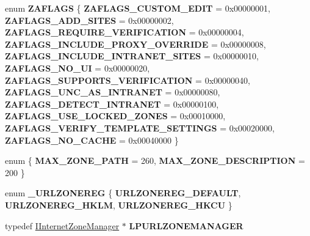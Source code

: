 \begin{DoxyCompactItemize}
enum {\bfseries Z\+A\+F\+L\+A\+GS} \{ \newline
{\bfseries Z\+A\+F\+L\+A\+G\+S\+\_\+\+C\+U\+S\+T\+O\+M\+\_\+\+E\+D\+IT} = 0x00000001, 
{\bfseries Z\+A\+F\+L\+A\+G\+S\+\_\+\+A\+D\+D\+\_\+\+S\+I\+T\+ES} = 0x00000002, 
{\bfseries Z\+A\+F\+L\+A\+G\+S\+\_\+\+R\+E\+Q\+U\+I\+R\+E\+\_\+\+V\+E\+R\+I\+F\+I\+C\+A\+T\+I\+ON} = 0x00000004, 
{\bfseries Z\+A\+F\+L\+A\+G\+S\+\_\+\+I\+N\+C\+L\+U\+D\+E\+\_\+\+P\+R\+O\+X\+Y\+\_\+\+O\+V\+E\+R\+R\+I\+DE} = 0x00000008, 
\newline
{\bfseries Z\+A\+F\+L\+A\+G\+S\+\_\+\+I\+N\+C\+L\+U\+D\+E\+\_\+\+I\+N\+T\+R\+A\+N\+E\+T\+\_\+\+S\+I\+T\+ES} = 0x00000010, 
{\bfseries Z\+A\+F\+L\+A\+G\+S\+\_\+\+N\+O\+\_\+\+UI} = 0x00000020, 
{\bfseries Z\+A\+F\+L\+A\+G\+S\+\_\+\+S\+U\+P\+P\+O\+R\+T\+S\+\_\+\+V\+E\+R\+I\+F\+I\+C\+A\+T\+I\+ON} = 0x00000040, 
{\bfseries Z\+A\+F\+L\+A\+G\+S\+\_\+\+U\+N\+C\+\_\+\+A\+S\+\_\+\+I\+N\+T\+R\+A\+N\+ET} = 0x00000080, 
\newline
{\bfseries Z\+A\+F\+L\+A\+G\+S\+\_\+\+D\+E\+T\+E\+C\+T\+\_\+\+I\+N\+T\+R\+A\+N\+ET} = 0x00000100, 
{\bfseries Z\+A\+F\+L\+A\+G\+S\+\_\+\+U\+S\+E\+\_\+\+L\+O\+C\+K\+E\+D\+\_\+\+Z\+O\+N\+ES} = 0x00010000, 
{\bfseries Z\+A\+F\+L\+A\+G\+S\+\_\+\+V\+E\+R\+I\+F\+Y\+\_\+\+T\+E\+M\+P\+L\+A\+T\+E\+\_\+\+S\+E\+T\+T\+I\+N\+GS} = 0x00020000, 
{\bfseries Z\+A\+F\+L\+A\+G\+S\+\_\+\+N\+O\+\_\+\+C\+A\+C\+HE} = 0x00040000
 \}
\item 
\mbox{\label{interface_i_internet_zone_manager_afebaa6012ca6e09c96630a4e4b1234d0}} 
enum \{ {\bfseries M\+A\+X\+\_\+\+Z\+O\+N\+E\+\_\+\+P\+A\+TH} = 260, 
{\bfseries M\+A\+X\+\_\+\+Z\+O\+N\+E\+\_\+\+D\+E\+S\+C\+R\+I\+P\+T\+I\+ON} = 200
 \}
\item 
\mbox{\label{interface_i_internet_zone_manager_abea6d9e487039d145153d75d36479a5f}} 
enum {\bfseries \+\_\+\+U\+R\+L\+Z\+O\+N\+E\+R\+EG} \{ {\bfseries U\+R\+L\+Z\+O\+N\+E\+R\+E\+G\+\_\+\+D\+E\+F\+A\+U\+LT}, 
{\bfseries U\+R\+L\+Z\+O\+N\+E\+R\+E\+G\+\_\+\+H\+K\+LM}, 
{\bfseries U\+R\+L\+Z\+O\+N\+E\+R\+E\+G\+\_\+\+H\+K\+CU}
 \}
\item 
\mbox{\label{interface_i_internet_zone_manager_ab787cd05118d65d0c47738a5db3a40e4}} 
typedef \hyperlink{interface_i_internet_zone_manager}{I\+Internet\+Zone\+Manager} $\ast$ {\bfseries L\+P\+U\+R\+L\+Z\+O\+N\+E\+M\+A\+N\+A\+G\+ER}
\item 

\end{DoxyCompactItemize}
